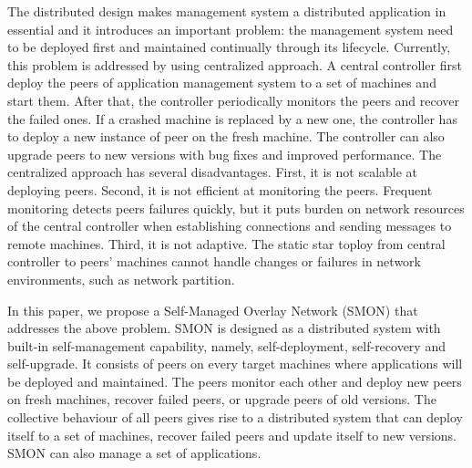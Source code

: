 The distributed design makes management system a distributed
application in essential and it introduces an important
problem: the management system need to be deployed first and
maintained continually through its lifecycle. Currently,
this problem is addressed by using centralized approach. A
central controller first deploy the peers of application
management system to a set of machines and start them. After
that, the controller periodically monitors the peers and
recover the failed ones. If a crashed machine is replaced by
a new one, the controller has to deploy a new instance of
peer on the fresh machine. The controller can also upgrade
peers to new versions with bug fixes and improved
performance. The centralized approach has several
disadvantages. First, it is not scalable at deploying peers.
Second, it is not efficient at monitoring the peers.
Frequent monitoring detects peers failures quickly, but it
puts burden on network resources of the central controller
when establishing connections and sending messages to remote
machines. Third, it is not adaptive. The static star toploy
from central controller to peers' machines cannot handle
changes or failures in network environments, such as network
partition.

In this paper, we propose a Self-Managed Overlay Network
(SMON) that addresses the above problem. SMON is designed as
a distributed system with built-in self-management
capability, namely, self-deployment, self-recovery and
self-upgrade. It consists of peers on every target machines
where applications will be deployed and maintained. The
peers monitor each other and deploy new peers on fresh
machines, recover failed peers, or upgrade peers of old
versions. The collective behaviour of all peers gives rise
to a distributed system that can deploy itself to a set of
machines, recover failed peers and update itself to new
versions. SMON can also manage a set of applications.



